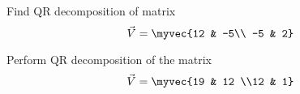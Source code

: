 \solution

\item Find QR decomposition of matrix
\begin{equation}
	\vec{V} = \myvec{12 & -5\\ -5 & 2}
\end{equation}

%
\solution

\item Perform QR decomposition of the matrix
\begin{align}
    \vec{V} = \myvec{19 & 12 \\12 & 1} \label{eq:solutions/decomp/4/1/42/1.1}
\end{align}



